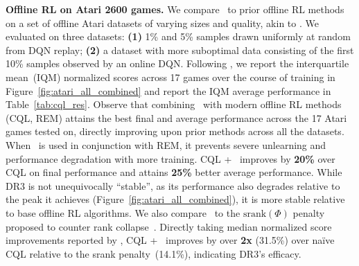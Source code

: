 \textbf{{Offline RL on Atari 2600 games.}} We compare \methodname\ to prior offline RL methods on a set of offline Atari datasets of varying sizes and quality, akin to \citet{agarwal2019optimistic, kumar2021implicit}. We evaluated on three datasets: \textbf{(1)} 1\% and 5\% samples drawn uniformly at random from DQN replay; \textbf{(2)} a dataset with more suboptimal data consisting of the first 10\% samples observed by an online DQN. Following \citet{agarwal2021precipice}, we report the interquartile mean~(IQM) normalized scores across 17 games over the course of training in Figure~\ref{fig:atari_all_combined} and report the IQM average performance in Table~\ref{tab:cql_res}. Observe that combining \methodname\ with modern offline RL methods (CQL, REM) attains the best final and average performance across the 17 Atari games tested on, directly improving upon prior methods
across all the datasets. When \methodname\ is used in conjunction with REM, it prevents {severe} unlearning and performance degradation with more training. CQL + \methodname\ improves by \textbf{20\%} over CQL on final performance and attains \textbf{25\%} better average performance. {While DR3 is not unequivocally ``stable'', as its performance also degrades relative to the peak it achieves (Figure~\ref{fig:atari_all_combined}), it is more stable relative to base offline RL algorithms.} We also compare \methodname\ to the $\mathrm{srank}(\Phi)$ penalty proposed to counter rank collapse~\citep{kumar2021implicit}. Directly taking median normalized score improvements reported by \citet{kumar2021implicit}, CQL + \methodname\ improves by over \textbf{2x} (31.5\%) over na\"ive CQL relative to the srank penalty~(14.1\%), indicating DR3's efficacy.
